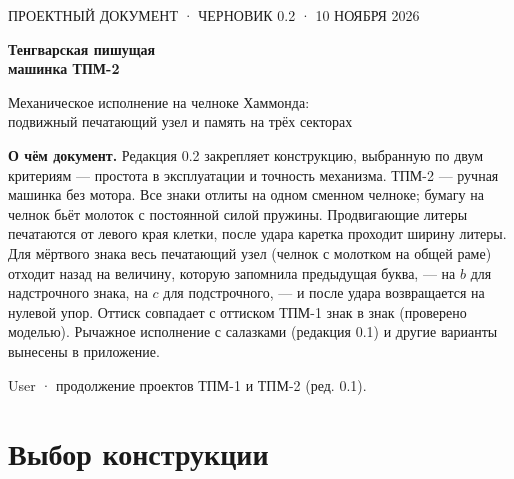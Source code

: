 


\begin{titlepage}
\vspace*{18mm}
{\sffamily\small ПРОЕКТНЫЙ ДОКУМЕНТ · ЧЕРНОВИК 0.2 · 10 НОЯБРЯ 2026}\par
\vspace{8mm}
{\sffamily\bfseries\fontsize{26}{30}\selectfont Тенгварская пишущая\\[2pt] машинка ТПМ-2}\par
\vspace{4mm}
{\large Механическое исполнение на челноке Хаммонда:\\ подвижный печатающий узел и память на трёх секторах}\par
\vspace{14mm}
\begin{center}
\setlength\tgem{13.5mm}
\begin{tikzpicture}[x=\tgu,y=\tgu]

\end{tikzpicture}
\end{center}
\vspace{6mm}
\noindent\begin{minipage}{0.86\textwidth}\small
\textbf{О чём документ.} Редакция 0.2 закрепляет конструкцию, выбранную по двум критериям — простота в эксплуатации и точность механизма. ТПМ-2 — ручная машинка без мотора. Все знаки отлиты на одном сменном челноке; бумагу на челнок бьёт молоток с постоянной силой пружины. Продвигающие литеры печатаются от левого края клетки, после удара каретка проходит ширину литеры. Для мёртвого знака весь печатающий узел (челнок с молотком на общей раме) отходит назад на величину, которую запомнила предыдущая буква, — на $b$ для надстрочного знака, на $c$ для подстрочного, — и после удара возвращается на нулевой упор. Оттиск совпадает с оттиском ТПМ-1 знак в знак (проверено моделью). Рычажное исполнение с салазками (редакция 0.1) и другие варианты вынесены в приложение.
\end{minipage}
\vfill
{\small User · продолжение проектов ТПМ-1 и ТПМ-2 (ред. 0.1).}
\end{titlepage}

\tableofcontents
\newpage

\section{Выбор конструкции}

